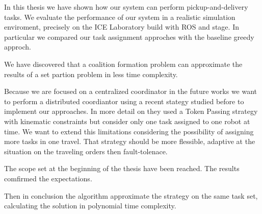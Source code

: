 In this thesis we have shown how our system can perform pickup-and-delivery tasks.
We evaluate the performance of our system in a realistic simulation enviroment,
precisely on the ICE Laboratory build with ROS and stage. 
In particular we compared our task assignment approches with the baseline greedy 
approch.

We have discovered that a coalition formation problem can approximate the results 
of a set partion problem in less time complexity.

Because we are focused on a centralized coordinator in the future works we want to 
perform a distributed coordiantor using a recent stategy studied before to implement 
our approaches.
In more detail on \cite{mapd} they used a Token Passing strategy with kinematic 
constraints but consider only one task assigned to one robot at time.
We want to extend this limitations considering the possibility of assigning more 
tasks in one travel.
That strategy should be more flessible, adaptive at the situation on the traveling
orders then fault-tolenace. 

The scope set at the beginning of the thesis have been reached.
The results comfirmed the expectations. 

Then in conclusion the \gsp algorithm approximate the \sps strategy on the same task set,
calculating the solution in polynomial time complexity.
